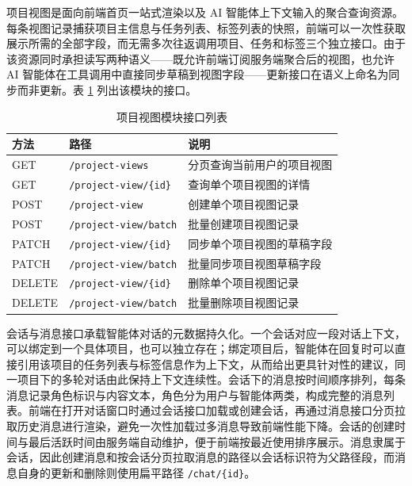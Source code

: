 \par 项目视图是面向前端首页一站式渲染以及 AI 智能体上下文输入的聚合查询资源。每条视图记录捕获项目主信息与任务列表、标签列表的快照，前端可以一次性获取展示所需的全部字段，而无需多次往返调用项目、任务和标签三个独立接口。由于该资源同时承担读写两种语义——既允许前端订阅服务端聚合后的视图，也允许 AI 智能体在工具调用中直接同步草稿到视图字段——更新接口在语义上命名为同步而非更新。表 \ref{tab:api-projectview} 列出该模块的接口。

\begin{table}[htbp]
  \centering
  \caption{项目视图模块接口列表}
  \label{tab:api-projectview}
  \begin{tabular}{p{2cm}p{5cm}p{6cm}}
    \hline
    方法 & 路径 & 说明 \\
    \hline
    GET & \texttt{/project-views} & 分页查询当前用户的项目视图 \\
    GET & \texttt{/project-view/\{id\}} & 查询单个项目视图的详情 \\
    POST & \texttt{/project-view} & 创建单个项目视图记录 \\
    POST & \texttt{/project-view/batch} & 批量创建项目视图记录 \\
    PATCH & \texttt{/project-view/\{id\}} & 同步单个项目视图的草稿字段 \\
    PATCH & \texttt{/project-view/batch} & 批量同步项目视图草稿字段 \\
    DELETE & \texttt{/project-view/\{id\}} & 删除单个项目视图记录 \\
    DELETE & \texttt{/project-view/batch} & 批量删除项目视图记录 \\
    \hline
  \end{tabular}
\end{table}

\par 会话与消息接口承载智能体对话的元数据持久化。一个会话对应一段对话上下文，可以绑定到一个具体项目，也可以独立存在；绑定项目后，智能体在回复时可以直接引用该项目的任务列表与标签信息作为上下文，从而给出更具针对性的建议，同一项目下的多轮对话由此保持上下文连续性。会话下的消息按时间顺序排列，每条消息记录角色标识与内容文本，角色分为用户与智能体两类，构成完整的消息列表。前端在打开对话窗口时通过会话接口加载或创建会话，再通过消息接口分页拉取历史消息进行渲染，避免一次性加载过多消息导致前端性能下降。会话的创建时间与最后活跃时间由服务端自动维护，便于前端按最近使用排序展示。消息隶属于会话，因此创建消息和按会话分页拉取消息的路径以会话标识符为父路径段，而消息自身的更新和删除则使用扁平路径 \texttt{/chat/\{id\}}。

